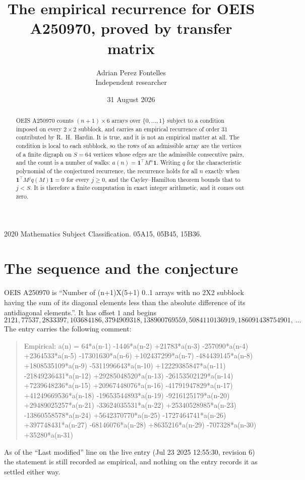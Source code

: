 \documentclass[11pt,a4paper]{article}
\title{The empirical recurrence for OEIS A250970, proved by transfer matrix}
\author{Adrian Perez Fontelles\\ \small Independent researcher}
\date{31 August 2026}
\theoremstyle{plain}
\theoremstyle{definition}
\begin{document}
\maketitle

\begin{abstract}
OEIS A250970 counts $(n+1)\times6$ arrays over $\{0,\dots,1\}$ subject to a condition imposed on
every $2\times2$ subblock, and carries an empirical recurrence of order $31$ contributed
by R.~H.~Hardin. It is true, and it is not an empirical matter at all. The condition is local
to each subblock, so the rows of an admissible array are the vertices of a finite digraph
on $S=64$ vertices whose edges are the admissible consecutive pairs, and the count is a
number of walks: $a(n)=\mathbf{1}^{\!\top}M^{n}\mathbf{1}$. Writing $q$
for the characteristic polynomial of the conjectured recurrence, the recurrence holds for all
$n$ exactly when $\mathbf{1}^{\!\top}M^{j}q(M)\mathbf{1}=0$ for every $j\ge0$, and the
Cayley--Hamilton theorem bounds that to $j<S$. It is therefore a finite computation in exact
integer arithmetic, and it comes out zero.
\end{abstract}

\noindent\small 2020 Mathematics Subject Classification. 05A15, 05B45, 15B36.\normalsize

\section{The sequence and the conjecture}

OEIS A250970 is ``Number of (n+1)X(5+1) 0..1 arrays with no 2X2 subblock having the sum of its diagonal elements less than the absolute difference of its antidiagonal elements.''. It has offset $1$ and begins
\[
2121, 77537, 2833397, 103684186, 3794909318, 138900769559, 5084110136919, 186091438754901,\ \dots
\]
The entry carries the following comment:
\begin{quote}\small
Empirical: a(n) = 64*a(n-1) -1446*a(n-2) +21783*a(n-3) -257090*a(n-4) +2364533*a(n-5) -17301630*a(n-6) +102437299*a(n-7) -484439145*a(n-8) +1808535109*a(n-9) -5311996643*a(n-10) +12229385847*a(n-11) -21849236431*a(n-12) +29285048520*a(n-13) -26153502129*a(n-14) +7239648236*a(n-15) +20967448076*a(n-16) -41791947829*a(n-17) +41249669536*a(n-18) -19653544893*a(n-19) -9216125179*a(n-20) +29489025257*a(n-21) -33624035531*a(n-22) +25340528985*a(n-23) -13860558578*a(n-24) +5642370770*a(n-25) -1727464741*a(n-26) +397748431*a(n-27) -68146076*a(n-28) +8635216*a(n-29) -707328*a(n-30) +35280*a(n-31)
\end{quote}
As of the ``Last modified'' line on the live entry (Jul 23 2025 12:55:30, revision 6) the statement is
still recorded as empirical, and nothing on the entry records it as settled either way.
\end{document}
